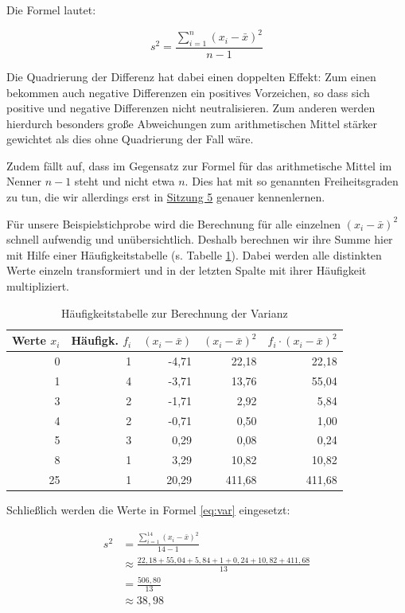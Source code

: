 \documentclass[
  11pt,
  ngerman,
  a4paper,
]{report}
\begin{document}
Die Formel lautet:

\[
  s^2=\frac{\sum\limits_{i=1}^{n}(x_{i}-\bar{x})^2}{n-1}
  \label{eq:var}
\]

Die Quadrierung der Differenz hat dabei einen doppelten Effekt: Zum einen bekommen auch negative Differenzen ein positives Vorzeichen, so dass sich positive und negative Differenzen nicht neutralisieren. Zum anderen werden hierdurch besonders große Abweichungen zum arithmetischen Mittel stärker gewichtet als dies ohne Quadrierung der Fall wäre.

Zudem fällt auf, dass im Gegensatz zur Formel für das arithmetische Mittel im Nenner \(n-1\) steht und nicht etwa \(n\). Dies hat mit so genannten Freiheitsgraden zu tun, die wir allerdings erst in \protect\hyperlink{freiheitsgrade}{Sitzung 5} genauer kennenlernen.

Für unsere Beispielstichprobe wird die Berechnung für alle einzelnen \((x_i-\bar{x})^2\) schnell aufwendig und unübersichtlich. Deshalb berechnen wir ihre Summe hier mit Hilfe einer Häufigkeitstabelle (s. Tabelle \ref{tab:freq}). Dabei werden alle distinkten Werte einzeln transformiert und in der letzten Spalte mit ihrer Häufigkeit multipliziert.

\begin{table}

\caption{\label{tab:freq}Häufigkeitstabelle zur Berechnung der Varianz}
\centering
\begin{tabular}[t]{rrrrr}
\toprule
Werte $x_i$ & Häufigk. $f_i$ & $(x_i- \bar{x})$ & $(x_i- \bar{x})^2$ & $f_i\cdot(x_i -\bar{x})^2$\\
\midrule
0 & 1 & -4,71 & 22,18 & 22,18\\
1 & 4 & -3,71 & 13,76 & 55,04\\
3 & 2 & -1,71 & 2,92 & 5,84\\
4 & 2 & -0,71 & 0,50 & 1,00\\
5 & 3 & 0,29 & 0,08 & 0,24\\
8 & 1 & 3,29 & 10,82 & 10,82\\
25 & 1 & 20,29 & 411,68 & 411,68\\
\bottomrule
\end{tabular}
\end{table}

Schließlich werden die Werte in Formel \eqref{eq:var} eingesetzt:

\nopagebreak

\[\begin{aligned}
    s^2&=\frac{\sum\limits_{i=1}^{14}(x_{i}-\bar{x})^2}{14-1} \\[4pt]
       &\approx\frac{22{,}18+55{,}04+5{,}84+1+0{,}24+10{,}82+411{,}68}{13} \\[4pt]
       &=\frac{506{,}80}{13}\\[4pt]
       &\approx 38{,}98
\end{aligned}\]
\end{document}
